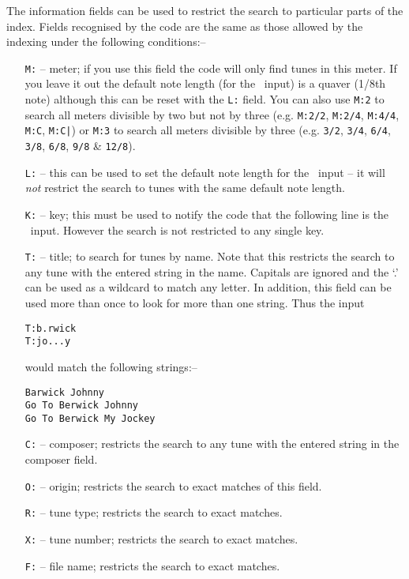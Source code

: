 The information fields can be used to restrict the search to particular parts
of the index. Fields recognised by the code are the same as those allowed by
the indexing under the following conditions:--
\begin{itemize}
\item[{\tt M:}] -- meter; if you use this field the code will only find
tunes in this meter. If you leave it out the default note length
(for the \abc\ input) is a quaver (1/8th note) although this can be reset with
the {\tt L:} field. You can also use {\tt M:2} to search all meters divisible
by two but not by three (e.g. {\tt M:2/2}, {\tt M:2/4},
{\tt M:4/4}, {\tt M:C}, {\tt M:C|}) or {\tt M:3} to search all
meters divisible by three (e.g. {\tt 3/2}, {\tt 3/4}, {\tt 6/4}, {\tt 3/8},
{\tt 6/8}, {\tt 9/8} \& {\tt 12/8}).
\item[{\tt L:}] -- this can be used to set the default note length
for the \abc\ input -- it will {\em not} restrict the search to tunes with the
same default note length.
\item[{\tt K:}] -- key; this must be used to notify the code that the following
line is the \abc\ input. However the search is not restricted to any
single key.
\item[{\tt T:}] -- title; to search for tunes by name. Note that
this restricts the search to any tune with the entered string
in the name. Capitals are ignored and the `.' can be used as a wildcard
to match any letter. In addition, this field can be used more
than once to look for more than one string. Thus the input
\begin{verbatim}
T:b.rwick
T:jo...y

\end{verbatim}
would match the following strings:--
\begin{verbatim}
Barwick Johnny
Go To Berwick Johnny
Go To Berwick My Jockey
\end{verbatim}
\item[{\tt C:}] -- composer; restricts the search to any tune with the entered
string in the composer field.
\item[{\tt O:}] -- origin; restricts the search to exact matches of this field.
\item[{\tt R:}] -- tune type; restricts the search to exact matches.
\item[{\tt X:}] -- tune number; restricts the search to exact matches.
\item[{\tt F:}] -- file name; restricts the search to exact matches.
\end{itemize}

